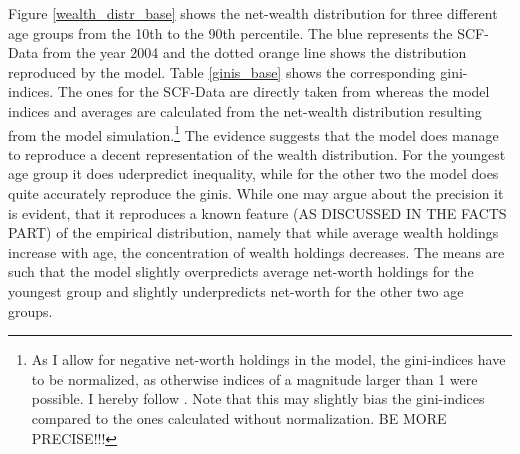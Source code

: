 \documentclass[a4paper,12pt]{article}
\begin{document}
Figure \ref{wealth_distr_base} shows the net-wealth distribution for three different age groups from the 10th to the 90th percentile. The blue represents the SCF-Data from the year 2004 and the dotted orange line shows the distribution reproduced by the model. 
Table \ref{ginis_base} shows the corresponding gini-indices. The ones for the SCF-Data are directly taken from \cite{hintermaier2011} whereas the model indices and averages are calculated from the net-wealth distribution resulting from the model simulation.\footnote{As I allow for negative net-worth holdings in the model, the gini-indices have to be normalized, as otherwise indices of a magnitude larger than 1 were possible. I hereby follow \cite{chen1982}. Note that this may slightly bias the gini-indices compared to the ones calculated without normalization. BE MORE PRECISE!!!} The evidence suggests that the model does manage to reproduce a decent representation of the wealth distribution. For the youngest age group it does uderpredict inequality, while for the other two the model does quite accurately reproduce the ginis. While one may argue about the precision it is evident, that it reproduces a known feature (AS DISCUSSED IN THE FACTS PART) of the empirical distribution, namely that while average wealth holdings increase with age, the concentration of wealth holdings decreases. 
The means are such that the model slightly overpredicts average net-worth holdings for the youngest group and slightly underpredicts net-worth for the other two age groups. 
\end{document}
